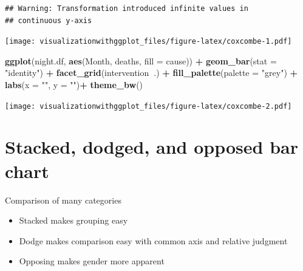 \documentclass[]{krantz}
\makeatletter
\newenvironment{Shaded}{\begin{snugshade}}{\end{snugshade}}
\newcommand{\DataTypeTok}[1]{\textcolor[rgb]{0.13,0.29,0.53}{#1}}
\newcommand{\KeywordTok}[1]{\textcolor[rgb]{0.13,0.29,0.53}{\textbf{#1}}}
\newcommand{\NormalTok}[1]{#1}
\newcommand{\OperatorTok}[1]{\textcolor[rgb]{0.81,0.36,0.00}{\textbf{#1}}}
\newcommand{\StringTok}[1]{\textcolor[rgb]{0.31,0.60,0.02}{#1}}
\newenvironment{kframe}{%
\medskip{}
\setlength{\fboxsep}{.8em}
 \def\at@end@of@kframe{}%
 \ifinner\ifhmode%
  \def\at@end@of@kframe{\end{minipage}}%
  \begin{minipage}{\columnwidth}%
 \fi\fi%
 \def\FrameCommand##1{\hskip\@totalleftmargin \hskip-\fboxsep
 \colorbox{shadecolor}{##1}\hskip-\fboxsep
     \hskip-\linewidth \hskip-\@totalleftmargin \hskip\columnwidth}%
 \MakeFramed {\advance\hsize-\width
   \@totalleftmargin\z@ \linewidth\hsize
   \@setminipage}}%
 {\par\unskip\endMakeFramed%
 \at@end@of@kframe}
\renewenvironment{Shaded}{\begin{kframe}}{\end{kframe}}
\makeatother
\begin{document}
\begin{verbatim}
## Warning: Transformation introduced infinite values in
## continuous y-axis
\end{verbatim}

\texttt{[image: visualizationwithggplot\_files/figure-latex/coxcombe-1.pdf]}

\begin{Shaded}
\begin{Highlighting}[]
\KeywordTok{ggplot}\NormalTok{(night.df, }\KeywordTok{aes}\NormalTok{(Month, deaths, }\DataTypeTok{fill =}\NormalTok{ cause)) }\OperatorTok{+}
\StringTok{  }\KeywordTok{geom_bar}\NormalTok{(}\DataTypeTok{stat =} \StringTok{"identity"}\NormalTok{) }\OperatorTok{+}
\StringTok{  }\KeywordTok{facet_grid}\NormalTok{(intervention}\OperatorTok{~}\NormalTok{.) }\OperatorTok{+}
\StringTok{   }\KeywordTok{fill_palette}\NormalTok{(}\DataTypeTok{palette =} \StringTok{"grey"}\NormalTok{) }\OperatorTok{+}
\StringTok{   }\KeywordTok{labs}\NormalTok{(}\DataTypeTok{x =} \StringTok{""}\NormalTok{, }\DataTypeTok{y =} \StringTok{""}\NormalTok{)}\OperatorTok{+}
\StringTok{  }\KeywordTok{theme_bw}\NormalTok{()}
\end{Highlighting}
\end{Shaded}

\texttt{[image: visualizationwithggplot\_files/figure-latex/coxcombe-2.pdf]}

\hypertarget{stacked-dodged-and-opposed-bar-chart}{%
\section{Stacked, dodged, and opposed bar chart}\label{stacked-dodged-and-opposed-bar-chart}}

Comparison of many categories

\begin{itemize}
\item
  Stacked makes grouping easy
\item
  Dodge makes comparison easy with common axis and relative judgment
\item
  Opposing makes gender more apparent
\end{itemize}
\end{document}
